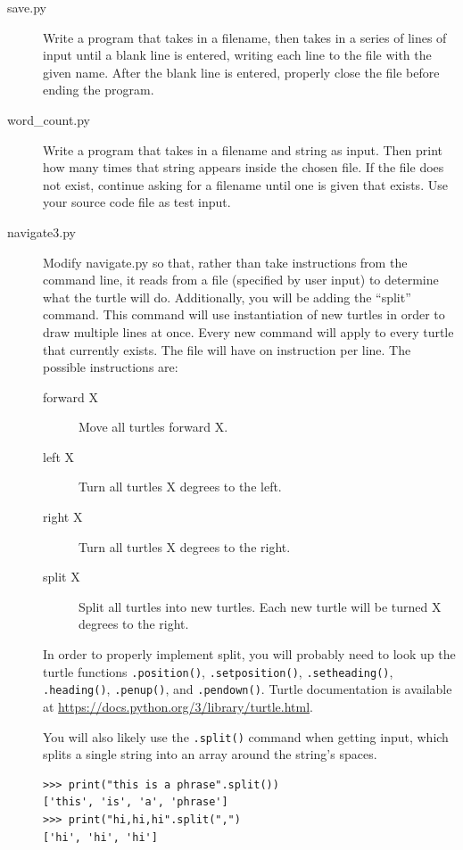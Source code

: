 \documentclass[11pt]{cselabheader}
\begin{document}
\begin{description}
\item[save.py] Write a program that takes in a filename, then takes in
  a series of lines of input until a blank line is entered, writing each line to
  the file with the given name. After the blank line is entered, properly close
  the file before ending the program.  

\item[word\_count.py] Write a program that
  takes in a filename and string as input. Then print how many times that string
  appears inside the chosen file. If the file does not exist, continue asking
  for a filename until one is given that exists. Use your source code file as
  test input.

  \item[navigate3.py] Modify navigate.py so that, rather than take instructions
    from the command line, it reads from a file (specified by user input) to
    determine what the turtle will do. Additionally, you will be adding the
    ``split'' command. This command will use instantiation of new turtles in order
    to draw multiple lines at once. Every new command will apply to every turtle
    that currently exists. The file will have on instruction per line. The
    possible instructions are:

    \begin{description}
      \item[forward X] Move all turtles forward X.
      \item[left X] Turn all turtles X degrees to the left.
      \item[right X] Turn all turtles X degrees to the right.
      \item[split X] Split all turtles into new turtles. Each new turtle will be turned X degrees to the right.
    \end{description}

    In order to properly implement split, you will probably need to look up the
    turtle functions \lstinline{.position()}, \lstinline{.setposition()},
    \lstinline{.setheading()}, \lstinline{.heading()}, \lstinline{.penup()}, and
    \lstinline{.pendown()}. Turtle documentation is available at
    \url{https://docs.python.org/3/library/turtle.html}.

    You will also likely use the \lstinline{.split()} command when getting input, which splits a single string into an array around the string's spaces.
    \begin{lstlisting}[style=ipython]
>>> print("this is a phrase".split())
['this', 'is', 'a', 'phrase']
>>> print("hi,hi,hi".split(",")
['hi', 'hi', 'hi']
    \end{lstlisting}


\end{description}
\end{document}
